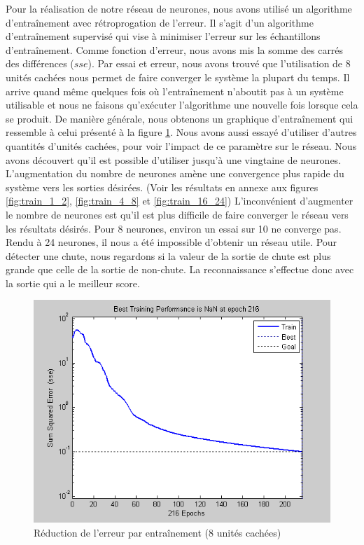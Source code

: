 \documentclass[12pt,letterpaper]{article}
\begin{document}
Pour la réalisation de notre réseau de neurones, nous avons utilisé un algorithme d'entraînement avec rétroprogation de l'erreur. Il s'agit d'un algorithme d'entraînement supervisé qui vise à minimiser l'erreur sur les échantillons d'entraînement. Comme fonction d'erreur, nous avons mis la somme des carrés des différences ($sse$). Par essai et erreur, nous avons trouvé que l'utilisation de 8 unités cachées nous permet de faire converger le système la plupart du temps. Il arrive quand même quelques fois où l'entraînement n'aboutit pas à un système utilisable et nous ne faisons qu'exécuter l'algorithme une nouvelle fois lorsque cela se produit. De manière générale, nous obtenons un graphique d'entraînement qui ressemble à celui présenté à la figure \ref{fig:training_8units}. Nous avons aussi essayé d'utiliser d'autres quantités d'unités cachées, pour voir l'impact de ce paramètre sur le réseau. Nous avons découvert qu'il est possible d'utiliser jusqu'à une vingtaine de neurones. L'augmentation du nombre de neurones amène une convergence plus rapide du système vers les sorties désirées. (Voir les résultats en annexe aux figures \ref{fig:train_1_2}, \ref{fig:train_4_8} et \ref{fig:train_16_24}) L'inconvénient d'augmenter le nombre de neurones est qu'il est plus difficile de faire converger le réseau vers les résultats désirés. Pour 8 neurones, environ un essai sur 10 ne converge pas. Rendu à 24 neurones, il nous a été impossible d'obtenir un réseau utile. Pour détecter une chute, nous regardons si la valeur de la sortie de chute est plus grande que celle de la sortie de non-chute. La reconnaissance s'effectue donc avec la sortie qui a le meilleur score.

\begin{figure}
    \centering
    \includegraphics[scale=0.6]{image/training_8units.png}
    \caption{Réduction de l'erreur par entraînement (8 unités cachées)}
    \label{fig:training_8units}
\end{figure}
\end{document}
